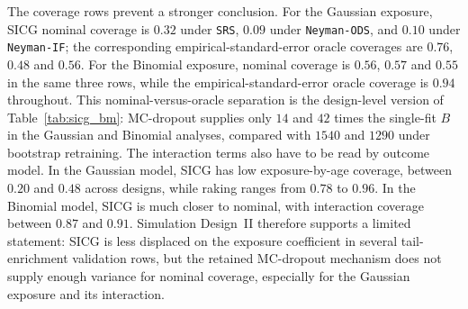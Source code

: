 The coverage rows prevent a stronger conclusion. For the Gaussian exposure, SICG nominal coverage is $0.32$ under \texttt{SRS}, $0.09$ under \texttt{Neyman-ODS}, and $0.10$ under \texttt{Neyman-IF}; the corresponding empirical-standard-error oracle coverages are $0.76$, $0.48$ and $0.56$. For the Binomial exposure, nominal coverage is $0.56$, $0.57$ and $0.55$ in the same three rows, while the empirical-standard-error oracle coverage is $0.94$ throughout. This nominal-versus-oracle separation is the design-level version of Table~\ref{tab:sicg_bm}: MC-dropout supplies only $14$ and $42$ times the single-fit \(B\) in the Gaussian and Binomial analyses, compared with $1540$ and $1290$ under bootstrap retraining. The interaction terms also have to be read by outcome model. In the Gaussian model, SICG has low exposure-by-age coverage, between $0.20$ and $0.48$ across designs, while raking ranges from $0.78$ to $0.96$. In the Binomial model, SICG is much closer to nominal, with interaction coverage between $0.87$ and $0.91$. Simulation Design~II therefore supports a limited statement: SICG is less displaced on the exposure coefficient in several tail-enrichment validation rows, but the retained MC-dropout mechanism does not supply enough variance for nominal coverage, especially for the Gaussian exposure and its interaction.

